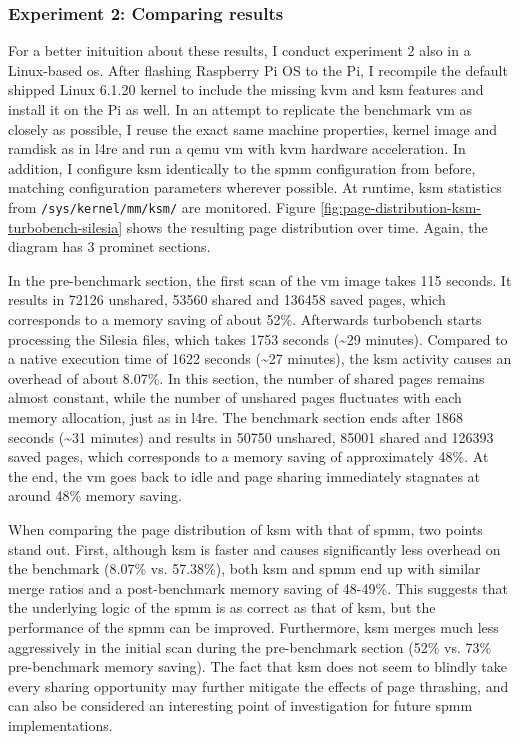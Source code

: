\subsubsection*{Experiment 2: Comparing results}
\label{subsubsec:ex2-linux}

For a better inituition about these results, I conduct experiment 2 also in a Linux-based \ac{os}.
After flashing Raspberry Pi OS to the Pi, I recompile the default shipped Linux 6.1.20 kernel to include the missing \ac{kvm} and \ac{ksm} features and install it on the Pi as well.
In an attempt to replicate the benchmark \ac{vm} as closely as possible, I reuse the exact same machine properties, kernel image and ramdisk as in \ac{l4re} and run a qemu \ac{vm} with \ac{kvm} hardware acceleration.
In addition, I configure \ac{ksm} identically to the \ac{spmm} configuration from before, matching configuration parameters wherever possible.
At runtime, \ac{ksm} statistics from \texttt{/sys/kernel/mm/ksm/} are monitored.
Figure \ref{fig:page-distribution-ksm-turbobench-silesia} shows the resulting page distribution over time.
Again, the diagram has 3 prominet sections.

In the pre-benchmark section, the first scan of the \ac{vm} image takes 115 seconds.
It results in 72126 unshared, 53560 shared and 136458 saved pages, which corresponds to a memory saving of about 52\%.
Afterwards turbobench starts processing the Silesia files, which takes 1753 seconds (\textasciitilde{}29 minutes).
Compared to a native execution time of 1622 seconds (\textasciitilde{}27 minutes), the \ac{ksm} activity causes an overhead of about 8.07\%.
In this section, the number of shared pages remains almost constant, while the number of unshared pages fluctuates with each memory allocation, just as in \ac{l4re}.
The benchmark section ends after 1868 seconds (\textasciitilde{}31 minutes) and results in 50750 unshared, 85001 shared and 126393 saved pages, which corresponds to a memory saving of approximately 48\%.
At the end, the \ac{vm} goes back to idle and page sharing immediately stagnates at around 48\% memory saving.

When comparing the page distribution of \ac{ksm} with that of \ac{spmm}, two points stand out.
First, although \ac{ksm} is faster and causes significantly less overhead on the benchmark (8.07\% vs. 57.38\%), both \ac{ksm} and \ac{spmm} end up with similar merge ratios and a post-benchmark memory saving of 48-49\%.
This suggests that the underlying logic of the \ac{spmm} is as correct as that of \ac{ksm}, but the performance of the \ac{spmm} can be improved.
Furthermore, \ac{ksm} merges much less aggressively in the initial scan during the pre-benchmark section (52\% vs. 73\% pre-benchmark memory saving).
The fact that \ac{ksm} does not seem to blindly take every sharing opportunity may further mitigate the effects of page thrashing, and can also be considered an interesting point of investigation for future \ac{spmm} implementations.

